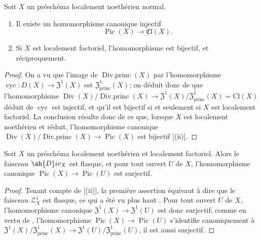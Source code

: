 \begin{corollary}[21.6.10]
\label{IV.21.6.10}
Soit $X$ un préschéma localement noethérien \textup{normal}.
\begin{enumerate}[label=\textup{(\roman*)}]
  \item Il existe un homomorphisme canonique injectif
\[
\label{IV.21.6.10.1}
  \operatorname{Pic}(X)\to\mathfrak{Cl}(X).
  \tag{21.6.10.1}
\]

  \item Si $X$ est localement factoriel, l'homomorphisme  est bijectif, et réciproquement.
\end{enumerate}
\end{corollary}

\begin{proof}
On a vu  que l'image de $\operatorname{Div.princ}(X)$ par l'homomorphisme $\operatorname{cyc}:D(X)\to\mathfrak{Z}^1(X)$ est $\mathfrak{Z}^1_\mathrm{princ}(X)$;
on déduit donc de  que l'homomorphisme $\operatorname{Div}(X)/\operatorname{Div.princ}(X)\to\mathfrak{Z}^1(X)/\mathfrak{Z}^1_\mathrm{princ}(X)=\mathrm{Cl}(X)$ déduit de $\operatorname{cyc}$ est injectif, et qu'il est bijectif si et seulement si $X$ est localement factoriel.
La conclusion résulte donc de ce que, lorsque $X$ est localement noethérien et réduit, l'homomorphisme canonique $\operatorname{Div}(X)/\operatorname{Div.princ}(X)\to\operatorname{Pic}(X)$  est bijectif [(ii)].
\end{proof}

\begin{corollary}[21.6.11]
\label{IV.21.6.11}
Soit $X$ un préschéma localement noethérien et localement factoriel.
Alors le faisceau $\sh{D}iv_X$ est flasque, et pour tout ouvert $U$ de $X$, l'homomorphisme canonique $\operatorname{Pic}(X)\to\operatorname{Pic}(U)$ est surjectif.
\end{corollary}

\begin{proof}
Tenant compte de [(ii)], la première assertion équivaut à dire que le faisceau $\mathscr{Z}_X^1$ est flasque, ce qui a été vu plus haut .
Pour tout ouvert $U$ de $X$, l'homomorphisme canonique $\mathfrak{Z}^1(X)\to\mathfrak{Z}^1(U)$ est donc surjectif;
comme en vertu de , l'homomorphisme $\operatorname{Pic}(X)\to\operatorname{Pic}(U)$ s'identifie canoniquement à $\mathfrak{Z}^1(X)/\mathfrak{Z}^1_\mathrm{princ}(X)\to\mathfrak{Z}^1(U)/\mathfrak{Z}^1_\mathrm{princ}(U)$, il est aussi surjectif.
\end{proof}

